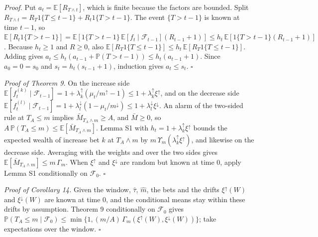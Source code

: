 \documentclass[
]{article}
\begin{document}
\emph{Proof.} Put \(a_t = \mathbb{E}[R_{T\wedge t}]\), which is finite
because the factors are bounded. Split
\(R_{T\wedge t} = R_T 1\lbrace T \le t-1\rbrace + R_t 1\lbrace T > t-1\rbrace\).
The event \(\lbrace T > t-1\rbrace\) is known at time \(t-1\), so
\(\mathbb{E}[R_t 1\lbrace T > t-1\rbrace] = \mathbb{E}[1\lbrace T > t-1\rbrace\,\mathbb{E}[f_t \mid \mathcal{F}_{t-1}](R_{t-1} + 1)] \le h_t\,\mathbb{E}[1\lbrace T > t-1\rbrace(R_{t-1} + 1)]\).
Because \(h_t \ge 1\) and \(R \ge 0\), also
\(\mathbb{E}[R_T 1\lbrace T \le t-1\rbrace] \le h_t\,\mathbb{E}[R_T 1\lbrace T \le t-1\rbrace]\).
Adding gives
\(a_t \le h_t(a_{t-1} + \mathbb{P}(T > t-1)) \le h_t(a_{t-1} + 1)\).
Since \(a_0 = 0 = s_0\) and \(s_t = h_t(s_{t-1} + 1)\), induction gives
\(a_t \le s_t\). \(\square\)

\emph{Proof of Theorem 9.} On the increase side
\(\mathbb{E}[f_t^{(k)} \mid \mathcal{F}_{t-1}] = 1 + \lambda_k^{\uparrow}(\mu_t/m^{\uparrow} - 1) \le 1 + \lambda_k^{\uparrow}\xi^{\uparrow}\),
and on the decrease side
\(\mathbb{E}[f_t^{(l)} \mid \mathcal{F}_{t-1}] = 1 + \lambda_l^{\downarrow}(1 - \mu_t/m^{\downarrow}) \le 1 + \lambda_l^{\downarrow}\xi^{\downarrow}\).
An alarm of the two-sided rule at \(T_A \le m\) implies
\(\bar M_{T_A \wedge m} \ge A\), and \(\bar M \ge 0\), so
\(A\,\mathbb{P}(T_A \le m) \le \mathbb{E}[\bar M_{T_A \wedge m}]\).
Lemma S1 with \(h_t = 1 + \lambda_k^{\uparrow}\xi^{\uparrow}\) bounds
the expected wealth of increase bet \(k\) at \(T_A \wedge m\) by
\(m\,\Upsilon_m(\lambda_k^{\uparrow}\xi^{\uparrow})\), and likewise on
the decrease side. Averaging with the weights and over the two sides
gives \(\mathbb{E}[\bar M_{T_A \wedge m}] \le m\,\Gamma_m\). When
\(\xi^{\uparrow}\) and \(\xi^{\downarrow}\) are random but known at time
0, apply Lemma S1 conditionally on \(\mathcal{F}_0\). \(\square\)

\emph{Proof of Corollary 14.} Given the window, \(\hat\tau\),
\(\hat m\), the bets and the drifts \(\xi^{\uparrow}(W)\) and
\(\xi^{\downarrow}(W)\) are known at time 0, and the conditional means
stay within these drifts by assumption. Theorem 9 conditionally on
\(\mathcal{F}_0\) gives
\(\mathbb{P}(T_A \le m \mid \mathcal{F}_0) \le \min\lbrace 1, (m/A)\,\Gamma_m(\xi^{\uparrow}(W), \xi^{\downarrow}(W))\rbrace\);
take expectations over the window. \(\square\)
\end{document}
